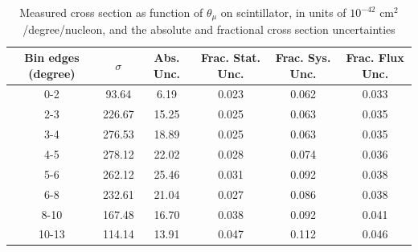 \documentclass[../main.tex]{subfiles}
\begin{document}
\begin{table}
  \centering
  \renewcommand{\arraystretch}{1.15}
  \caption{Systematic covariance matrix of measured cross section in $p_{\mu}$ on scintillator, in units of $10^{-84}$ $(\text{cm}^2$/GeV/c/nucleon$)^2$}
  \label{tbl:sysnucleonplasticmuon_pc}
\end{table}
\pagebreak
\begin{turnpage}
\end{turnpage}
\begin{table}
  \centering
  \renewcommand{\arraystretch}{1.15}
  \caption{Measured cross section as function of $\theta_{\mu}$ on scintillator, in units of $10^{-42}$ $\text{cm}^2$/degree/nucleon, and the absolute and fractional cross section uncertainties}
    \begin{tabular}{c||c|c||c|c|c}
      Bin edges (degree) &  $\sigma$  &  Abs. Unc.  &  Frac. Stat. Unc.  &  Frac. Sys. Unc.  &  Frac. Flux Unc. \\
      \hline
      \hline
      0-2 & 93.64 & 6.19 & 0.023 & 0.062 & 0.033\\
      2-3 & 226.67 & 15.25 & 0.025 & 0.063 & 0.035\\
      3-4 & 276.53 & 18.89 & 0.025 & 0.063 & 0.035\\
      4-5 & 278.12 & 22.02 & 0.028 & 0.074 & 0.036\\
      5-6 & 262.12 & 25.46 & 0.031 & 0.092 & 0.038\\
      6-8 & 232.61 & 21.04 & 0.027 & 0.086 & 0.038\\
      8-10 & 167.48 & 16.70 & 0.038 & 0.092 & 0.041\\
      10-13 & 114.14 & 13.91 & 0.047 & 0.112 & 0.046
    \end{tabular}
  \label{tbl:datanucleonplasticmuon_thetaa}
\end{table}
\end{document}
